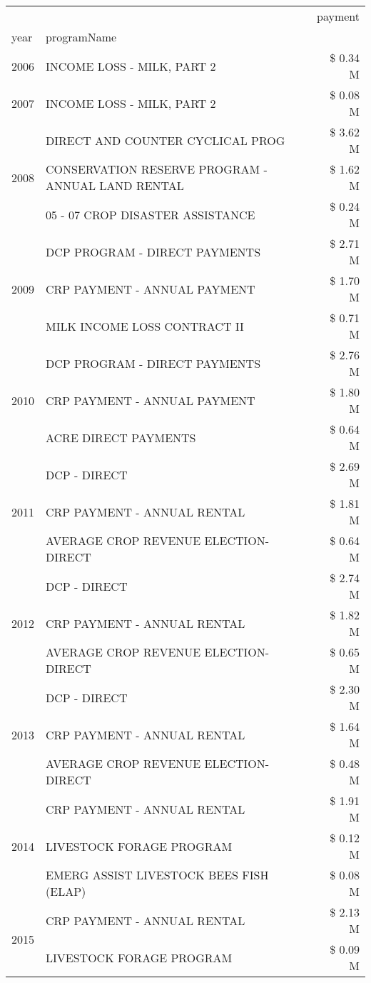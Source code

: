 \begin{tabular}{llr}
\toprule
 &  & payment \\
year & programName &  \\
\midrule
2006 & INCOME LOSS - MILK, PART 2 & \$ 0.34 M \\
\cline{1-3}
2007 & INCOME LOSS - MILK, PART 2 & \$ 0.08 M \\
\cline{1-3}
\multirow[t]{3}{*}{2008} & DIRECT AND COUNTER CYCLICAL PROG & \$ 3.62 M \\
 & CONSERVATION RESERVE PROGRAM - ANNUAL LAND RENTAL & \$ 1.62 M \\
 & 05 - 07 CROP DISASTER ASSISTANCE & \$ 0.24 M \\
\cline{1-3}
\multirow[t]{3}{*}{2009} & DCP PROGRAM - DIRECT PAYMENTS & \$ 2.71 M \\
 & CRP PAYMENT - ANNUAL PAYMENT & \$ 1.70 M \\
 & MILK INCOME LOSS CONTRACT II & \$ 0.71 M \\
\cline{1-3}
\multirow[t]{3}{*}{2010} & DCP PROGRAM - DIRECT PAYMENTS & \$ 2.76 M \\
 & CRP PAYMENT - ANNUAL PAYMENT & \$ 1.80 M \\
 & ACRE DIRECT PAYMENTS & \$ 0.64 M \\
\cline{1-3}
\multirow[t]{3}{*}{2011} & DCP - DIRECT & \$ 2.69 M \\
 & CRP PAYMENT - ANNUAL RENTAL & \$ 1.81 M \\
 & AVERAGE CROP REVENUE ELECTION-DIRECT & \$ 0.64 M \\
\cline{1-3}
\multirow[t]{3}{*}{2012} & DCP - DIRECT & \$ 2.74 M \\
 & CRP PAYMENT - ANNUAL RENTAL & \$ 1.82 M \\
 & AVERAGE CROP REVENUE ELECTION-DIRECT & \$ 0.65 M \\
\cline{1-3}
\multirow[t]{3}{*}{2013} & DCP - DIRECT & \$ 2.30 M \\
 & CRP PAYMENT - ANNUAL RENTAL & \$ 1.64 M \\
 & AVERAGE CROP REVENUE ELECTION-DIRECT & \$ 0.48 M \\
\cline{1-3}
\multirow[t]{3}{*}{2014} & CRP PAYMENT - ANNUAL RENTAL & \$ 1.91 M \\
 & LIVESTOCK FORAGE PROGRAM & \$ 0.12 M \\
 & EMERG ASSIST LIVESTOCK BEES FISH (ELAP) & \$ 0.08 M \\
\cline{1-3}
\multirow[t]{3}{*}{2015} & CRP PAYMENT - ANNUAL RENTAL & \$ 2.13 M \\
 & LIVESTOCK FORAGE PROGRAM & \$ 0.09 M \\

\end{tabular}
